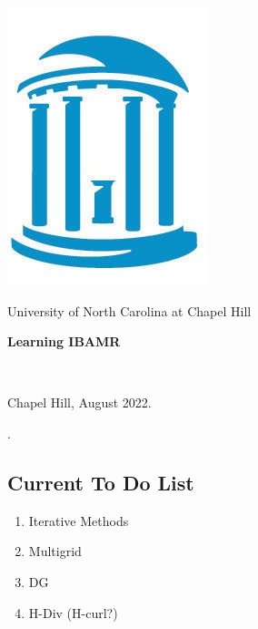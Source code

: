 \documentclass[12pt,a4paper,twoside]{article}
\begin{document}
\thispagestyle{empty}
\begin{center}
\includegraphics[scale=0.4]{UNC_logo-main.jpg}
\end{center}
\begin{center}
University of North Carolina at Chapel Hill\\
\vspace{5cm}
\begin{Large}
\textbf{Learning IBAMR}\\
\end{Large}
\vspace{4.5cm}
\begin{tabular}{llC{4cm}llll}

\end{tabular}\\
\vspace{4.5cm}
Chapel Hill, August 2022.
\end{center}

\newpage
\thispagestyle{empty}
.


 \newpage
\thispagestyle{empty}
\subsection*{Current To Do List}
\begin{enumerate}
    \item Iterative Methods
    \item Multigrid
    \item DG
    \item H-Div (H-curl?)
\end{enumerate}
\end{document}
